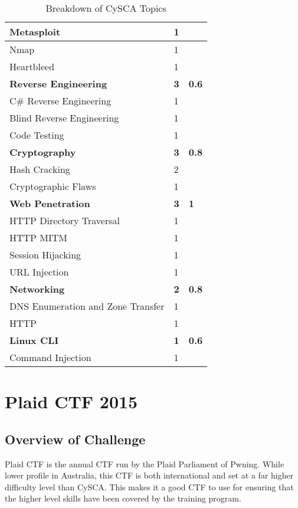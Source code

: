 \documentclass[a4paper,11pt]{report}
\begin{document}
\begin{table}[htb]
\begin{tabular}{| l | l | l |}
				\quad Metasploit & 1 & \\ \hline 
				\quad Nmap & 1 & \\ \hline 
				\quad Heartbleed & 1 & \\ \hline
				\textbf{Reverse Engineering} & \textbf{3} & \textbf{0.6}\\ \hline 
				\quad C\# Reverse Engineering & 1 & \\ \hline
				\quad Blind Reverse Engineering & 1 & \\ \hline 
				\quad Code Testing & 1 & \\ \hline 
				\textbf{Cryptography} & \textbf{3} & \textbf{0.8} \\ \hline 
				\quad Hash Cracking & 2 & \\ \hline
				\quad Cryptographic Flaws & 1 & \\ \hline 
				\textbf{Web Penetration} & \textbf{3} & \textbf{1} \\ \hline
				\quad HTTP Directory Traversal & 1 & \\ \hline
				\quad HTTP MITM & 1 & \\ \hline
				\quad Session Hijacking & 1 & \\ \hline
				\quad URL Injection & 1 & \\ \hline
				\textbf{Networking} & \textbf{2} & \textbf{0.8}\\ \hline
				\quad DNS Enumeration and Zone Transfer & 1 & \\ \hline 
				\quad HTTP & 1 & \\ \hline 
				\textbf{Linux CLI} & \textbf{1} &\textbf{0.6} \\ \hline
				\quad Command Injection & 1 & \\ \hline 
			\end{tabular}
			\caption{Breakdown of CySCA Topics}
			\label{tab:CySEC Breakdown}
		\end{table}
\chapter{Plaid CTF 2015}
	\section{Overview of Challenge}
		Plaid CTF is the annual CTF run by the Plaid Parliament of Pwning. 
		While lower profile in Australia, this CTF is both international and set at a far higher difficulty level than CySCA. 
		This makes it a good CTF to use for ensuring that the higher level skills have been covered by the training program. 
	
\end{document}
